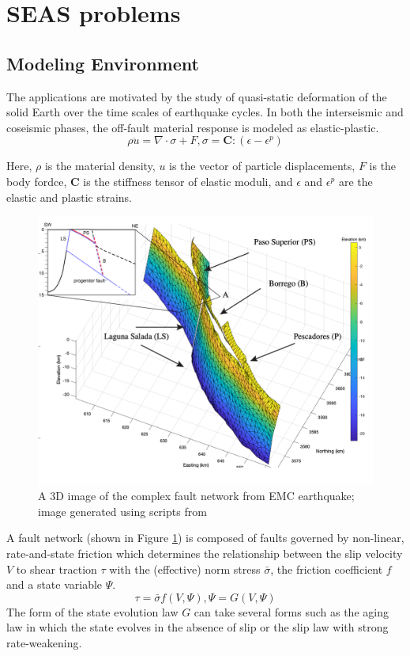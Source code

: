 \section{SEAS problems}
\subsection{Modeling Environment}
The applications are motivated by the study of quasi-static deformation of the solid Earth over the time scales of earthquake cycles.
In both the interseismic and coseismic phases, the off-fault material response is modeled as elastic-plastic.
\begin{equation}\label{eqn:governing}
    \rho \ddot{u} = \nabla \cdot \sigma + F, \sigma = \boldsymbol{C} : (\epsilon - \epsilon^p) 
\end{equation}

Here, $\rho$ is the material density, $u$ is the vector of particle displacements, $F$ is the body fordce, $\boldsymbol{C}$ is the stiffness tensor of elastic moduli, and $\epsilon$ and $\epsilon^p$ are the elastic and plastic strains.
\begin{figure}
    \centering
    \includegraphics[width=\linewidth]{figures/fault-network.png}
    \caption{A 3D image of the complex fault network from EMC earthquake; image generated using scripts from \cite{https://doi.org/10.1002/2016GL072289}}
    \label{fig:fault-network}
\end{figure}
A fault network (shown in Figure \ref{fig:fault-network}) is composed of faults governed by non-linear, rate-and-state friction which determines the relationship between the slip velocity $V$ to shear traction $\tau$ with the (effective) norm stress $\bar{\sigma}$, the friction coefficient $f$ and a state variable $\Psi$.
\begin{equation}\label{eqn:friction-law}
    \tau = \bar{\sigma} f(V,\Psi), \Psi = G(V, \Psi)
\end{equation}
The form of the state evolution law $G$ can take several forms such as the aging law in which the state evolves in the absence of slip or the slip law with strong rate-weakening.

